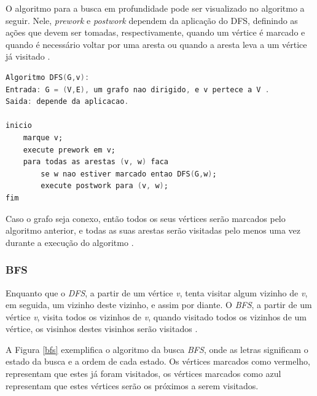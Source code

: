 O algoritmo para a busca em profundidade pode ser visualizado no algoritmo a seguir. Nele, \textit{prework} e \textit{postwork} dependem da aplicação do DFS, definindo as ações que devem ser tomadas, respectivamente, quando um vértice é marcado e quando é necessário voltar por uma aresta ou quando a aresta leva a um vértice já visitado \cite{Manber:1989}.

\begin{lstlisting}[language=Ada]
Algoritmo DFS(G,v):
Entrada: G = (V,E), um grafo nao dirigido, e v pertece a V .
Saida: depende da aplicacao.

inicio
	marque v;
	execute prework em v;
	para todas as arestas (v, w) faca
		se w nao estiver marcado entao DFS(G,w);
		execute postwork para (v, w);
fim
\end{lstlisting}

Caso o grafo seja conexo, então todos os seus vértices serão marcados pelo algoritmo anterior, e todas as suas arestas serão visitadas pelo menos uma vez durante a execução do algoritmo \cite{Manber:1989}.

\subsubsection{BFS}

Enquanto que o \textit{DFS}, a partir de um vértice \textit{v}, tenta visitar algum vizinho de \textit{v}, em seguida, um vizinho deste vizinho, e assim por diante. O \textit{BFS}, a partir de um vértice \textit{v}, visita todos os vizinhos de \textit{v}, quando visitado todos os vizinhos de um vértice, os visinhos destes visinhos serão visitados \cite{Brassard:1988}.

A Figura \ref{bfs} exemplifica o algoritmo da busca \textit{BFS}, onde as letras significam o estado da busca e a ordem de cada estado. Os vértices marcados como vermelho, representam que estes já foram visitados, os vértices marcados como azul representam que estes vértices serão os próximos a serem visitados.

